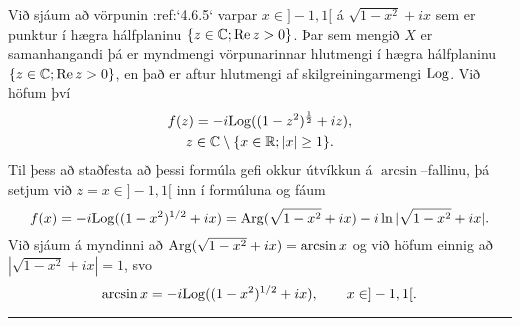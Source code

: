 Við sjáum að vörpunin :ref:`4.6.5`
varpar $x\in ]-1,1[$ á $\sqrt{1-x^2}+ix$ sem er punktur í hægra
hálfplaninu $\{z\in {\mathbb C}; {\operatorname{Re\, }} z>0\}$.  
Þar sem mengið $X$ er samanhangandi þá er myndmengi 
vörpunarinnar hlutmengi í hægra hálfplaninu $\{z\in {\mathbb C}; {\operatorname{Re\, }}
z>0\}$, en það er aftur hlutmengi af skilgreiningarmengi ${\operatorname{Log}}$.
Við höfum því 
\begin{multline*}
f(z) = -i{\operatorname{Log}} ((1-z^2)^{\frac 12}+iz), \\
z\in {\mathbb C}\setminus\{x\in {\mathbb R};|x|\geq 1\}.
\end{multline*}
Til þess að staðfesta að þessi formúla gefi okkur útvíkkun
á $\arcsin$--fallinu, þá setjum við $z=x\in ]-1,1[$ inn í formúluna
og fáum 
$$
f(x)=-i{\operatorname{Log}}((1-x^2)^{1/2}+ix)={\operatorname{Arg}}(\sqrt{1-x^2}+ix)-i\ln|\sqrt{1-x^2}+ix|.$$
Við sjáum á myndinni að 
${\operatorname{Arg}}(\sqrt{1-x^2}+ix)=\arcsin x$ og við höfum einnig að
$|\sqrt{1-x^2}+ix|=1$, svo 
$$\arcsin x=-i{\operatorname{Log}}((1-x^2)^{1/2}+ix),\qquad x\in ]-1,1[.
$$


\bigskip\hrule\bigskip


